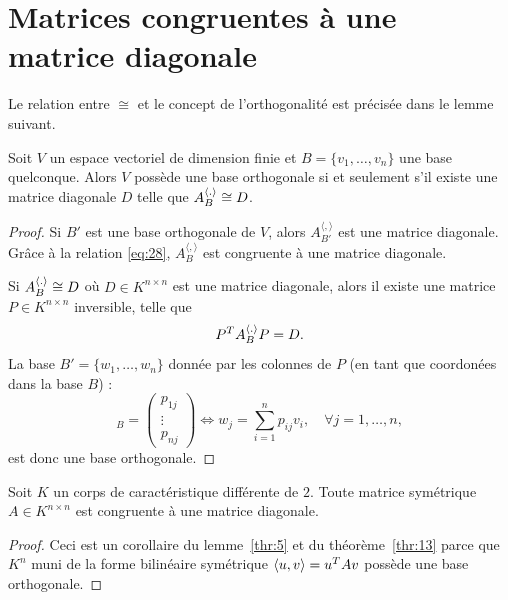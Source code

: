 \section{Matrices congruentes à une matrice diagonale} 
\label{sec:class-des-matr}




Le relation entre $\cong$ et le concept de l'orthogonalité   est précisée dans le lemme suivant. 
\begin{lemma}
\label{thr:13}
  Soit $V$ un espace vectoriel de dimension finie et $B = \{v_1,\dots,v_n\}$ une base quelconque. Alors $V$ possède une base orthogonale si et seulement s'il existe une matrice diagonale $D$ 
telle que 
 $A_B^{\langle {.} \rangle} \cong D$. 
\end{lemma}
\begin{proof}
Si $B'$ est une base orthogonale de $V$, alors $A_{B'}^{〈,〉}$ est une matrice diagonale. Grâce à la relation \eqref{eq:28}, $A_{B}^{〈,〉}$ est congruente à une matrice diagonale. 


Si $A_B^{\langle {.} \rangle} \cong D$ où $D ∈ K^{n×n}$ est une matrice diagonale, alors 
il existe une matrice $P ∈K^{n ×n}$ inversible, telle que 
\begin{displaymath}
  P^T A_B^{\langle {.} \rangle} P = D. 
\end{displaymath}
La base  $B' = \{w_1,\dots,w_n\}$ donnée par les colonnes de $P$ (en tant que coordonées dans la base $B$) :
  \begin{displaymath}
     [w_j]_B =
  \begin{pmatrix}
    p_{1j}\\ \vdots \\ p_{nj} 
  \end{pmatrix} \iff w_j = \sum_{i=1}^n p_{ij} v_i, \quad \forall j=1, \dots, n,
  \end{displaymath}
 est donc une base orthogonale. 
\end{proof}




 

\begin{corollary}
  \label{co:4}
  Soit $K$ un corps de caractéristique différente de $2$. Toute matrice symétrique  $A \in K^{n \times n}$ est congruente à une matrice diagonale. 
\end{corollary}
\begin{proof}
Ceci est un corollaire du  lemme~\ref{thr:5} et du théorème~\ref{thr:13} 
parce que  $K^n$ muni de la forme bilinéaire symétrique $\langle {u,v} \rangle = u^TAv$ possède une base orthogonale. 
\end{proof}

